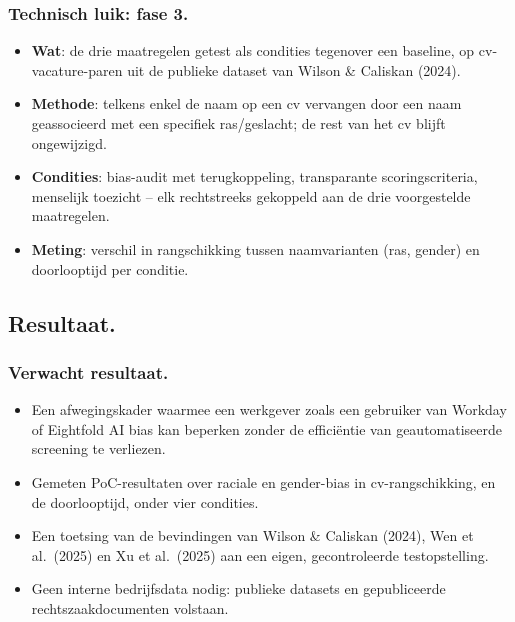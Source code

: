 \documentclass[aspectratio=169]{beamer}
\begin{document}
\begin{frame}
   	\frametitle{Technisch luik: fase 3.}
    \begin{itemize}
        \item \textbf{Wat}: de drie maatregelen getest als condities
            tegenover een baseline, op cv-vacature-paren uit de publieke
            dataset van Wilson \& Caliskan (2024).
        \item \textbf{Methode}: telkens enkel de naam op een cv
            vervangen door een naam geassocieerd met een specifiek
            ras/geslacht; de rest van het cv blijft ongewijzigd.
        \item \textbf{Condities}: bias-audit met terugkoppeling,
            transparante scoringscriteria, menselijk toezicht -- elk
            rechtstreeks gekoppeld aan de drie voorgestelde maatregelen.
        \item \textbf{Meting}: verschil in rangschikking tussen
            naamvarianten (ras, gender) en doorlooptijd per conditie.
    \end{itemize}
\end{frame}

\subsection{Resultaat.}

\begin{frame}
    \frametitle{Verwacht resultaat.}

    \begin{itemize}
        \item Een afwegingskader waarmee een werkgever zoals een
            gebruiker van Workday of Eightfold AI bias kan beperken
            zonder de efficiëntie van geautomatiseerde screening te
            verliezen.
        \item Gemeten PoC-resultaten over raciale en gender-bias in
            cv-rangschikking, en de doorlooptijd, onder vier condities.
        \item Een toetsing van de bevindingen van Wilson \& Caliskan
            (2024), Wen et al.\ (2025) en Xu et al.\ (2025) aan een
            eigen, gecontroleerde testopstelling.
        \item Geen interne bedrijfsdata nodig: publieke datasets en
            gepubliceerde rechtszaakdocumenten volstaan.
    \end{itemize}
\end{frame}
\end{document}
